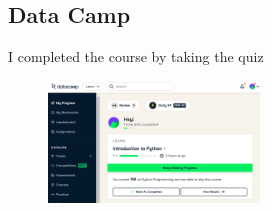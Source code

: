  
\subsection{Data Camp}

I completed the course by taking the quiz
\begin{figure}[h]
  \centering
  \includegraphics[width=0.5\textwidth]{image/Datacamp.png}
\end{figure}